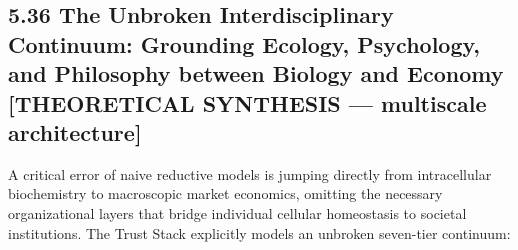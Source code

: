 \documentclass[
]{article}
\begin{document}
\subsection{5.36 The Unbroken Interdisciplinary Continuum: Grounding
Ecology, Psychology, and Philosophy between Biology and Economy
{[}THEORETICAL SYNTHESIS --- multiscale
architecture{]}}\label{the-unbroken-interdisciplinary-continuum-grounding-ecology-psychology-and-philosophy-between-biology-and-economy-theoretical-synthesis-multiscale-architecture}

A critical error of naive reductive models is jumping directly from
intracellular biochemistry to macroscopic market economics, omitting the
necessary organizational layers that bridge individual cellular
homeostasis to societal institutions. The Trust Stack explicitly models
an unbroken seven-tier continuum:
\end{document}
